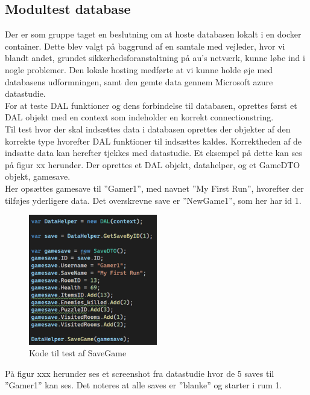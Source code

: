 \subsection{Modultest database}
Der er som gruppe taget en beslutning om at hoste databasen lokalt i en docker container. Dette blev valgt på baggrund af en samtale med vejleder, hvor vi blandt andet, grundet sikkerhedsforanstaltning på au’s netværk, kunne løbe ind i nogle problemer.
Den lokale hosting medførte at vi kunne holde øje med databasens udformningen, samt den gemte data gennem Microsoft azure datastudie.\\

For at teste DAL funktioner og dens forbindelse til databasen, oprettes først et DAL objekt med en context som indeholder en korrekt connectionstring.\\

Til test hvor der skal indsættes data i databasen oprettes der objekter af den korrekte type hvorefter DAL funktioner til indsættes kaldes. Korrektheden af de indsatte data kan herefter tjekkes med datastudie.
Et eksempel på dette kan ses på figur xx herunder.
Der oprettes et DAL objekt, datahelper, og et GameDTO objekt, gamesave.\\
Her opsættes gamesave til ”Gamer1”, med navnet ”My First Run”, hvorefter der tilføjes yderligere data. Det overskrevne save er ”NewGame1”, som her har id 1.

\begin{figure}[H]
\centering
\includegraphics[width = 0.5\textwidth]{02-Body/Images/DAL-Database/NewSave.png}
\caption{Kode til test af SaveGame}
\label{fig:SaveGame-test}
\end{figure}

På figur xxx herunder ses et screenshot fra datastudie hvor de 5 saves til ”Gamer1” kan ses.
Det noteres at alle saves er ”blanke” og starter i rum 1.

